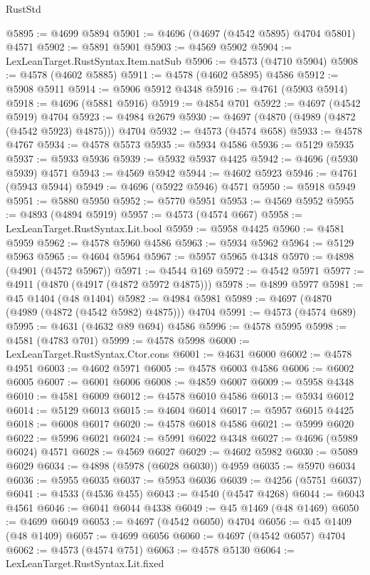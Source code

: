\begin{lexlean}{RustStd}
\begin{coremodule}
@5895 := @4699 @5894
@5901 := @4696 (@4697 (@4542 @5895) @4704 @5801) @4571
@5902 := @5891 @5901
@5903 := @4569 @5902
@5904 := LexLeanTarget.RustSyntax.Item.natSub
@5906 := @4573 (@4710 @5904)
@5908 := @4578 (@4602 @5885)
@5911 := @4578 (@4602 @5895) @4586
@5912 := @5908 @5911
@5914 := @5906 @5912 @4348
@5916 := @4761 (@5903 @5914)
@5918 := @4696 (@5881 @5916)
@5919 := @4854 @701
@5922 := @4697 (@4542 @5919) @4704
@5923 := @4984 @2679
@5930 := @4697 (@4870 (@4989 (@4872 (@4542 @5923) @4875))) @4704
@5932 := @4573 (@4574 @658)
@5933 := @4578 @4767
@5934 := @4578 @5573
@5935 := @5934 @4586
@5936 := @5129 @5935
@5937 := @5933 @5936
@5939 := @5932 @5937 @4425
@5942 := @4696 (@5930 @5939) @4571
@5943 := @4569 @5942
@5944 := @4602 @5923
@5946 := @4761 (@5943 @5944)
@5949 := @4696 (@5922 @5946) @4571
@5950 := @5918 @5949
@5951 := @5880 @5950
@5952 := @5770 @5951
@5953 := @4569 @5952
@5955 := @4893 (@4894 @5919)
@5957 := @4573 (@4574 @667)
@5958 := LexLeanTarget.RustSyntax.Lit.bool
@5959 := @5958 @4425
@5960 := @4581 @5959
@5962 := @4578 @5960 @4586
@5963 := @5934 @5962
@5964 := @5129 @5963
@5965 := @4604 @5964
@5967 := @5957 @5965 @4348
@5970 := @4898 (@4901 (@4572 @5967))
@5971 := @4544 @169
@5972 := @4542 @5971
@5977 := @4911 (@4870 (@4917 (@4872 @5972 @4875)))
@5978 := @4899 @5977
@5981 := @45 @1404 (@48 @1404)
@5982 := @4984 @5981
@5989 := @4697 (@4870 (@4989 (@4872 (@4542 @5982) @4875))) @4704
@5991 := @4573 (@4574 @689)
@5995 := @4631 (@4632 @89 @694) @4586
@5996 := @4578 @5995
@5998 := @4581 (@4783 @701)
@5999 := @4578 @5998
@6000 := LexLeanTarget.RustSyntax.Ctor.cons
@6001 := @4631 @6000
@6002 := @4578 @4951
@6003 := @4602 @5971
@6005 := @4578 @6003 @4586
@6006 := @6002 @6005
@6007 := @6001 @6006
@6008 := @4859 @6007
@6009 := @5958 @4348
@6010 := @4581 @6009
@6012 := @4578 @6010 @4586
@6013 := @5934 @6012
@6014 := @5129 @6013
@6015 := @4604 @6014
@6017 := @5957 @6015 @4425
@6018 := @6008 @6017
@6020 := @4578 @6018 @4586
@6021 := @5999 @6020
@6022 := @5996 @6021
@6024 := @5991 @6022 @4348
@6027 := @4696 (@5989 @6024) @4571
@6028 := @4569 @6027
@6029 := @4602 @5982
@6030 := @5089 @6029
@6034 := @4898 (@5978 (@6028 @6030)) @4959
@6035 := @5970 @6034
@6036 := @5955 @6035
@6037 := @5953 @6036
@6039 := @4256 (@5751 @6037)
@6041 := @4533 (@4536 @455)
@6043 := @4540 (@4547 @4268)
@6044 := @6043 @4561
@6046 := @6041 @6044 @4338
@6049 := @45 @1469 (@48 @1469)
@6050 := @4699 @6049
@6053 := @4697 (@4542 @6050) @4704
@6056 := @45 @1409 (@48 @1409)
@6057 := @4699 @6056
@6060 := @4697 (@4542 @6057) @4704
@6062 := @4573 (@4574 @751)
@6063 := @4578 @5130
@6064 := LexLeanTarget.RustSyntax.Lit.fixed

\end{coremodule}
\end{lexlean}
